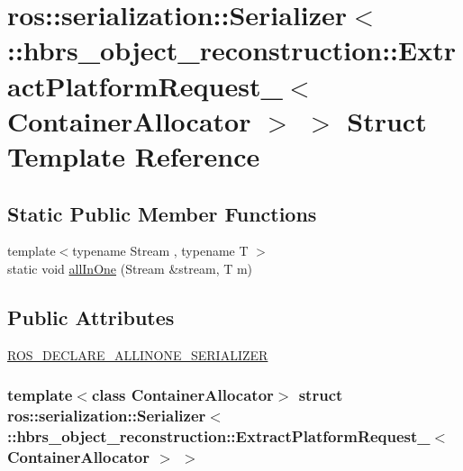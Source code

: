 \hypertarget{structros_1_1serialization_1_1_serializer_3_01_1_1hbrs__object__reconstruction_1_1_extract_platfec7db37c76a5940d2c079d0cd2e0ad4d}{\section{ros\-:\-:serialization\-:\-:\-Serializer$<$ \-:\-:hbrs\-\_\-object\-\_\-reconstruction\-:\-:\-Extract\-Platform\-Request\-\_\-$<$ \-Container\-Allocator $>$ $>$ \-Struct \-Template \-Reference}
\label{structros_1_1serialization_1_1_serializer_3_01_1_1hbrs__object__reconstruction_1_1_extract_platfec7db37c76a5940d2c079d0cd2e0ad4d}
}
\subsection*{\-Static \-Public \-Member \-Functions}
\begin{DoxyCompactItemize}
\item 
{\footnotesize template$<$typename Stream , typename T $>$ }\\static void \hyperlink{structros_1_1serialization_1_1_serializer_3_01_1_1hbrs__object__reconstruction_1_1_extract_platfec7db37c76a5940d2c079d0cd2e0ad4d_a1768d6e174e391ec821ee53ca9dec343}{all\-In\-One} (\-Stream \&stream, \-T m)
\end{DoxyCompactItemize}
\subsection*{\-Public \-Attributes}
\begin{DoxyCompactItemize}
\item 
\hyperlink{structros_1_1serialization_1_1_serializer_3_01_1_1hbrs__object__reconstruction_1_1_extract_platfec7db37c76a5940d2c079d0cd2e0ad4d_a4ad1a065dc6689574a618ce644968f24}{\-R\-O\-S\-\_\-\-D\-E\-C\-L\-A\-R\-E\-\_\-\-A\-L\-L\-I\-N\-O\-N\-E\-\_\-\-S\-E\-R\-I\-A\-L\-I\-Z\-E\-R}
\end{DoxyCompactItemize}
\subsubsection*{template$<$class Container\-Allocator$>$ struct ros\-::serialization\-::\-Serializer$<$ \-::hbrs\-\_\-object\-\_\-reconstruction\-::\-Extract\-Platform\-Request\-\_\-$<$ Container\-Allocator $>$ $>$}



